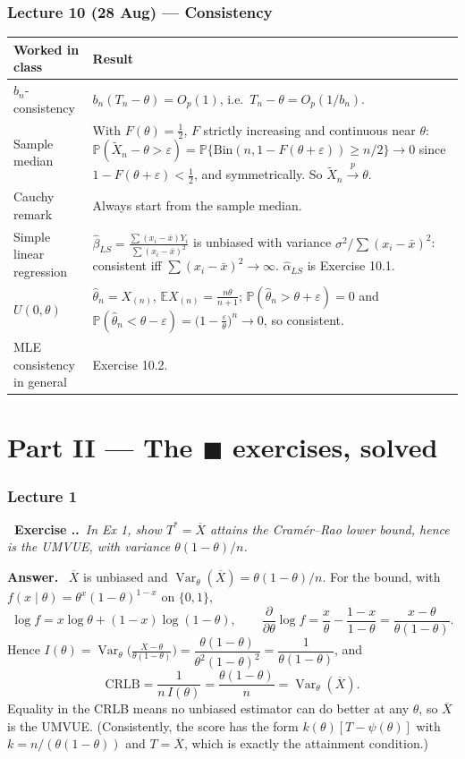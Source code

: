 \documentclass[11pt]{article}
\newcommand{\E}{\mathbb{E}}
\newcommand{\Var}{\operatorname{Var}}
\newcommand{\Prob}{\mathbb{P}}
\newcommand{\Xbar}{\overline{X}}
\newcommand{\pto}{\overset{p}{\longrightarrow}}
\newcounter{exc}[section]
\newenvironment{exc}[1]{\medskip\refstepcounter{exc}%
  \noindent\textbf{\color{ForestGreen}\raisebox{0.5pt}{\scriptsize$\blacksquare$}\ Exercise \thesection.\theexc.}\ \textit{#1}\par\nopagebreak}{\par}
\newcommand{\ans}{\smallskip\noindent\textbf{Answer.}\ }
\begin{document}
\section*{Lecture 10 (28 Aug) --- Consistency}
\begin{longtable}{@{}p{7.2cm}p{9.0cm}@{}}
\toprule
\textbf{Worked in class} & \textbf{Result} \\
\midrule
$b_n$-consistency &
$b_n(T_n-\theta)=O_p(1)$, i.e.\ $T_n-\theta=O_p(1/b_n)$. \\
Sample median &
With $F(\theta)=\tfrac12$, $F$ strictly increasing and continuous near $\theta$:
$\Prob(\tilde X_n-\theta>\varepsilon)=\Prob\{\mathrm{Bin}(n,1-F(\theta+\varepsilon))\ge n/2\}\to0$
since $1-F(\theta+\varepsilon)<\tfrac12$, and symmetrically. So $\tilde X_n\pto\theta$. \\
Cauchy remark & Always start from the sample median. \\
Simple linear regression &
$\hat\beta_{LS}=\frac{\sum(x_i-\bar x)Y_i}{\sum(x_i-\bar x)^2}$ is unbiased with variance
$\sigma^2/\sum(x_i-\bar x)^2$: consistent iff $\sum(x_i-\bar x)^2\to\infty$.
$\hat\alpha_{LS}$ is Exercise 10.1. \\
$U(0,\theta)$ &
$\hat\theta_n=X_{(n)}$, $\E X_{(n)}=\frac{n\theta}{n+1}$;
$\Prob(\hat\theta_n>\theta+\varepsilon)=0$ and
$\Prob(\hat\theta_n<\theta-\varepsilon)=\big(1-\tfrac\varepsilon\theta\big)^n\to0$, so
consistent. \\
MLE consistency in general & Exercise 10.2. \\
\bottomrule
\end{longtable}

\newpage
\part*{Part II --- The \texorpdfstring{$\blacksquare$}{marked} exercises, solved}

\section{Lecture 1}

\begin{exc}{In Ex 1, show $T^*=\Xbar$ attains the Cram\'er--Rao lower bound, hence is the
UMVUE, with variance $\theta(1-\theta)/n$.}
\end{exc}
\ans
$\Xbar$ is unbiased and $\Var_\theta(\Xbar)=\theta(1-\theta)/n$. For the bound, with
$f(x\mid\theta)=\theta^x(1-\theta)^{1-x}$ on $\{0,1\}$,
\[
\log f=x\log\theta+(1-x)\log(1-\theta),\qquad
\frac{\partial}{\partial\theta}\log f=\frac{x}{\theta}-\frac{1-x}{1-\theta}
=\frac{x-\theta}{\theta(1-\theta)} .
\]
Hence
$I(\theta)=\Var_\theta\!\big(\tfrac{X-\theta}{\theta(1-\theta)}\big)
=\dfrac{\theta(1-\theta)}{\theta^2(1-\theta)^2}=\dfrac{1}{\theta(1-\theta)}$, and
\[
\text{CRLB}=\frac{1}{n\,I(\theta)}=\frac{\theta(1-\theta)}{n}=\Var_\theta(\Xbar).
\]
Equality in the CRLB means no unbiased estimator can do better at any $\theta$, so $\Xbar$
is the UMVUE. (Consistently, the score has the form $k(\theta)[T-\psi(\theta)]$ with
$k=n/(\theta(1-\theta))$ and $T=\Xbar$, which is exactly the attainment condition.)
\end{document}
